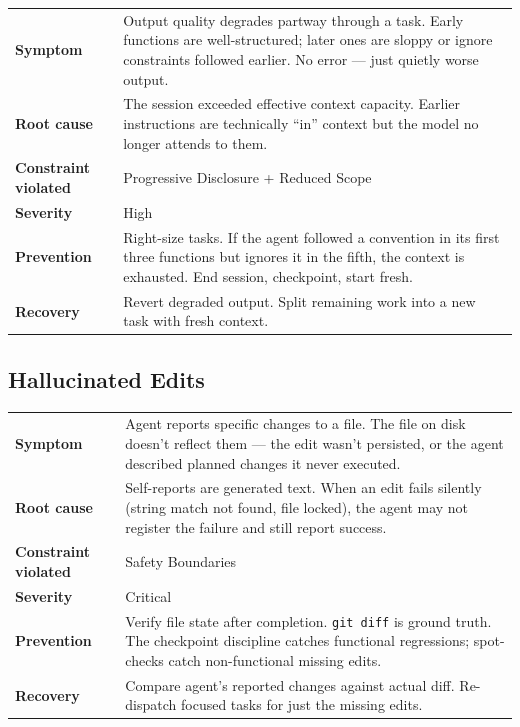 \documentclass[
  a4paper,
  DIV=11,
  numbers=noendperiod]{scrreprt}
\newcounter{none} %
\begin{document}
{\def\LTcaptype{none} %
\begin{longtable}[]{@{}
  >{\raggedright\arraybackslash}p{}
  >{\raggedright\arraybackslash}p{}@{}}
\toprule\noalign{}
\endhead
\bottomrule\noalign{}
\endlastfoot
\textbf{Symptom} & Output quality degrades partway through a task. Early
functions are well-structured; later ones are sloppy or ignore
constraints followed earlier. No error --- just quietly worse output. \\
\textbf{Root cause} & The session exceeded effective context capacity.
Earlier instructions are technically ``in'' context but the model no
longer attends to them. \\
\textbf{Constraint violated} & Progressive Disclosure + Reduced Scope \\
\textbf{Severity} & High \\
\textbf{Prevention} & Right-size tasks. If the agent followed a
convention in its first three functions but ignores it in the fifth, the
context is exhausted. End session, checkpoint, start fresh. \\
\textbf{Recovery} & Revert degraded output. Split remaining work into a
new task with fresh context. \\
\end{longtable}
}

\subsection{Hallucinated Edits}\label{hallucinated-edits}

{\def\LTcaptype{none} %
\begin{longtable}[]{@{}
  >{\raggedright\arraybackslash}p{}
  >{\raggedright\arraybackslash}p{}@{}}
\toprule\noalign{}
\endhead
\bottomrule\noalign{}
\endlastfoot
\textbf{Symptom} & Agent reports specific changes to a file. The file on
disk doesn't reflect them --- the edit wasn't persisted, or the agent
described planned changes it never executed. \\
\textbf{Root cause} & Self-reports are generated text. When an edit
fails silently (string match not found, file locked), the agent may not
register the failure and still report success. \\
\textbf{Constraint violated} & Safety Boundaries \\
\textbf{Severity} & Critical \\
\textbf{Prevention} & Verify file state after completion.
\texttt{git\ diff} is ground truth. The checkpoint discipline catches
functional regressions; spot-checks catch non-functional missing
edits. \\
\textbf{Recovery} & Compare agent's reported changes against actual
diff. Re-dispatch focused tasks for just the missing edits. \\
\end{longtable}
}
\end{document}
